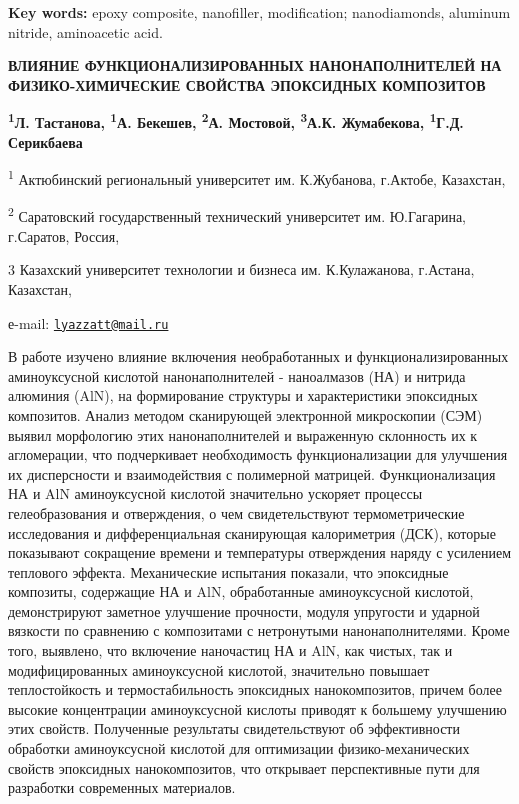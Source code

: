{\bfseries Key words:} epoxy composite, nanofiller, modification;
nanodiamonds, aluminum nitride, aminoacetic acid.

\begin{articleheader}
{\bfseries ВЛИЯНИЕ ФУНКЦИОНАЛИЗИРОВАННЫХ НАНОНАПОЛНИТЕЛЕЙ НА
ФИЗИКО-ХИМИЧЕСКИЕ СВОЙСТВА ЭПОКСИДНЫХ КОМПОЗИТОВ}

{\bfseries \textsuperscript{1}Л. Тастанова\textsuperscript{\envelope },
\textsuperscript{1}А. Бекешев, \textsuperscript{2}А. Мостовой,
\textsuperscript{3}А.К. Жумабекова, \textsuperscript{1}Г.Д. Серикбаева}
\end{articleheader}

\begin{affiliation}
\textsuperscript{1} Актюбинский региональный университет им. К.Жубанова,
г.Актобе, Казахстан,

\textsuperscript{2} Саратовский государственный технический университет
им. Ю.Гагарина, г.Саратов, Россия,

3 Казахский университет технологии и бизнеса им. К.Кулажанова, г.Астана,
Казахстан,

е-mail: \href{mailto:lyazzatt@mail.ru}{\nolinkurl{lyazzatt@mail.ru}}
\end{affiliation}

В работе изучено влияние включения необработанных и
функционализированных аминоуксусной кислотой нанонаполнителей -
наноалмазов (НА) и нитрида алюминия (AlN), на формирование структуры и
характеристики эпоксидных композитов. Анализ методом сканирующей
электронной микроскопии (СЭМ) выявил морфологию этих нанонаполнителей и
выраженную склонность их к агломерации, что подчеркивает необходимость
функционализации для улучшения их дисперсности и взаимодействия с
полимерной матрицей. Функционализация НА и AlN аминоуксусной кислотой
значительно ускоряет процессы гелеобразования и отверждения, о чем
свидетельствуют термометрические исследования и дифференциальная
сканирующая калориметрия (ДСК), которые показывают сокращение времени и
температуры отверждения наряду с усилением теплового эффекта.
Механические испытания показали, что эпоксидные композиты, содержащие НА
и AlN, обработанные аминоуксусной кислотой, демонстрируют заметное
улучшение прочности, модуля упругости и ударной вязкости по сравнению с
композитами с нетронутыми нанонаполнителями. Кроме того, выявлено, что
включение наночастиц НА и AlN, как чистых, так и модифицированных
аминоуксусной кислотой, значительно повышает теплостойкость и
термостабильность эпоксидных нанокомпозитов, причем более высокие
концентрации аминоуксусной кислоты приводят к большему улучшению этих
свойств. Полученные результаты свидетельствуют об эффективности
обработки аминоуксусной кислотой для оптимизации физико-механических
свойств эпоксидных нанокомпозитов, что открывает перспективные пути для
разработки современных материалов.

